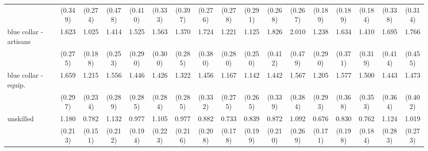 {\begin{tabular}{l*{16}{c}}
                    &     (0.349)         &     (0.274)         &     (0.478)         &     (0.410)         &     (0.333)         &     (0.397)         &     (0.276)         &     (0.278)         &     (0.291)         &     (0.268)         &     (0.267)         &     (0.189)         &     (0.189)         &     (0.184)         &     (0.338)         &     (0.314)         \\
[1em]
blue collar - artisans&       1.623\sym{**} &       1.025         &       1.414         &       1.525\sym{*}  &       1.563\sym{*}  &       1.370         &       1.724\sym{*}  &       1.221         &       1.125         &       1.826\sym{**} &       2.010\sym{**} &       1.238         &       1.634\sym{*}  &       1.410         &       1.695\sym{*}  &       1.766\sym{*}  \\
                    &     (0.275)         &     (0.188)         &     (0.253)         &     (0.290)         &     (0.300)         &     (0.285)         &     (0.380)         &     (0.280)         &     (0.250)         &     (0.412)         &     (0.479)         &     (0.290)         &     (0.371)         &     (0.319)         &     (0.414)         &     (0.455)         \\
[1em]
blue collar - equip.&       1.659\sym{**} &       1.215         &       1.556\sym{*}  &       1.446         &       1.426         &       1.322         &       1.456         &       1.167         &       1.142         &       1.442         &       1.567         &       1.205         &       1.577         &       1.500         &       1.443         &       1.473         \\
                    &     (0.297)         &     (0.234)         &     (0.289)         &     (0.285)         &     (0.284)         &     (0.285)         &     (0.332)         &     (0.275)         &     (0.265)         &     (0.339)         &     (0.384)         &     (0.293)         &     (0.368)         &     (0.353)         &     (0.364)         &     (0.402)         \\
[1em]
unskilled           &       1.180         &       0.782         &       1.132         &       0.977         &       1.105         &       0.977         &       0.882         &       0.733         &       0.839         &       0.872         &       1.092         &       0.676         &       0.830         &       0.762         &       1.124         &       1.019         \\
                    &     (0.213)         &     (0.151)         &     (0.212)         &     (0.194)         &     (0.223)         &     (0.216)         &     (0.208)         &     (0.178)         &     (0.199)         &     (0.210)         &     (0.269)         &     (0.171)         &     (0.198)         &     (0.184)         &     (0.283)         &     (0.273)         \\

\end{tabular}}
